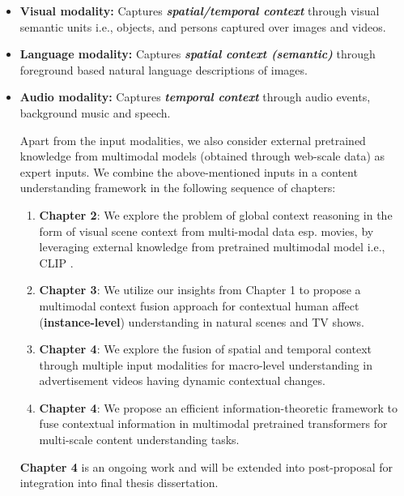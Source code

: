 \begin{itemize}
    \item  \textbf{Visual modality:} Captures \textbf{\textit{spatial/temporal context}} through visual semantic units i.e., objects, and persons captured over images and videos.
    \item  \textbf{Language modality:} Captures \textbf{\textit{spatial context (semantic)}} through foreground based natural language descriptions of images.
    \item  \textbf{Audio modality:} Captures \textbf{\textit{temporal context}} through audio events, background music and speech.

Apart from the input modalities, we also consider external pretrained knowledge from multimodal models (obtained through web-scale data) as expert inputs.
We combine the above-mentioned inputs in a content understanding framework in the following sequence of chapters:

\begin{enumerate}
    \item \textbf{Chapter 2}: We explore the problem of global context reasoning in the form of visual scene context from multi-modal data esp. movies, by leveraging external knowledge from pretrained multimodal model i.e., CLIP \cite{Radford2021LearningTV}.
    \item \textbf{Chapter 3}: We utilize our insights from Chapter 1 to propose a multimodal context fusion approach for contextual human affect (\textbf{instance-level}) understanding in natural scenes and TV shows.
    \item \textbf{Chapter 4}: We explore the fusion of spatial and temporal context through multiple input modalities for macro-level understanding in advertisement videos having dynamic contextual changes. 
    \item \textbf{Chapter 4}: We propose an efficient information-theoretic framework to fuse contextual information in multimodal pretrained transformers for multi-scale content understanding tasks.
\end{enumerate}

\textbf{Chapter 4} is an ongoing work and will be extended into post-proposal for integration into final thesis dissertation.

\end{itemize}
